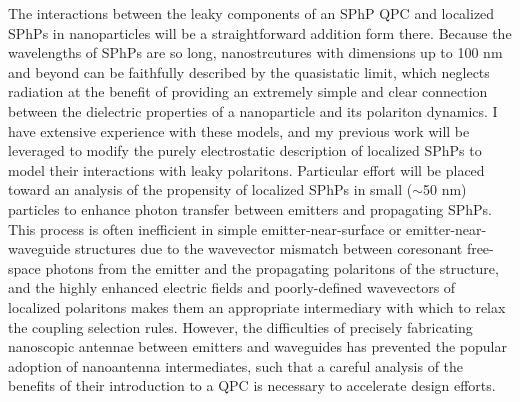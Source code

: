 \documentclass[11pt,a4paper]{article}
\begin{document}




The interactions between the leaky components of an SPhP QPC and localized SPhPs in nanoparticles will be a straightforward addition form there. Because the wavelengths of SPhPs are so long, nanostrcutures with dimensions up to 100 nm and beyond can be faithfully described by the quasistatic limit, which neglects radiation at the benefit of providing an extremely simple and clear connection between the dielectric properties of a nanoparticle and its polariton dynamics. I have extensive experience with these models, and my previous work will be leveraged to modify the purely electrostatic description of localized SPhPs to model their interactions with leaky polaritons. Particular effort will be placed toward an analysis of the propensity of localized SPhPs in small ($\sim$50 nm) particles to enhance photon transfer between emitters and propagating SPhPs. This process is often inefficient in simple emitter-near-surface or emitter-near-waveguide structures due to the wavevector mismatch between coresonant free-space photons from the emitter and the propagating polaritons of the structure, and the highly enhanced electric fields and poorly-defined wavevectors of localized polaritons makes them an appropriate intermediary with which to relax the coupling selection rules. However, the difficulties of precisely fabricating nanoscopic antennae between emitters and waveguides has prevented the popular adoption of nanoantenna intermediates, such that a careful analysis of the benefits of their introduction to a QPC is necessary to accelerate design efforts.
\end{document}
